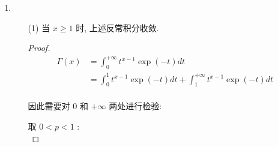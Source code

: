 \documentclass{article}
\begin{document}
\begin{enumerate}
\begin{enumerate}
\begin{proof}
\begin{equation}
\begin{aligned}
                \end{aligned}
                \nonumber
            \end{equation} \par
            综上, 得证.
        \end{proof}
        \item[(3)] \begin{proof}[解]
            $m$ 是奇数时, 被积函数是奇函数, 值为 $0$ ; \par
            $m$ 是偶数时, 使用(2)中的结论:
            \begin{equation}
                \begin{aligned}
                    \int_{-\infty}^{+\infty}x^m\exp(-x^2)dx
                    &=\frac{m-1}{2}\int_{-\infty}^{+\infty}x^{m-2}\exp(-x^2)dx \\
                    &=\frac{(m-1)(m-3)}{4}\int_{-\infty}^{+\infty}x^{m-4}\exp(-x^2)dx \\
                    &=\dots \\
                    &=\frac{(m-1)!!}{2^{\frac{m}{2}}}\int_{-\infty}^{+\infty}\exp(-x^2)dx \\
                    &=\frac{(m-1)!!}{2^{\frac{m}{2}}}\sqrt{\pi}
                \end{aligned}
                \nonumber
            \end{equation}
        \end{proof}
    \end{enumerate}
    \item \begin{enumerate}
        \item[(1)] 当 $x\geq1$ 时, 上述反常积分收敛. \par
        \begin{proof}
            \begin{equation}
                \begin{aligned}
                    \Gamma(x)
                    &=\int_{0}^{+\infty}t^{x-1}\exp(-t)dt \\
                    &=\int_{0}^{1}t^{x-1}\exp(-t)dt+\int_{1}^{+\infty}t^{x-1}\exp(-t)dt \\
                \end{aligned}
                \nonumber
            \end{equation} \par
            因此需要对 $0$ 和 $+\infty$ 两处进行检验: \par
            取 $0<p<1$ :
            \begin{equation}

\end{equation}
\end{proof}
\end{enumerate}
\end{enumerate}
\end{document}

